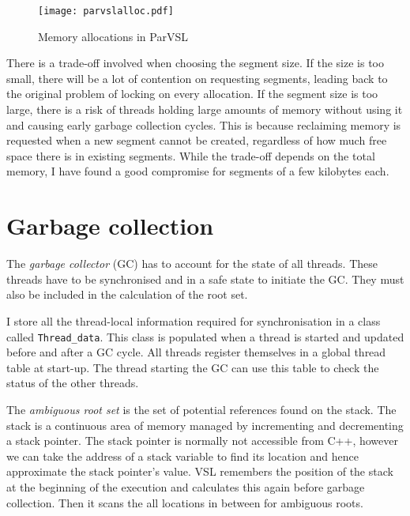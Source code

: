 \begin{figure}[H]
  \centering
  \texttt{[image: parvslalloc.pdf]}
  \label{fig:vslalloc}
  \caption{Memory allocations in ParVSL}
\end{figure}

There is a trade-off involved when choosing the segment size. If the size is too small,
there will be a lot of contention on requesting segments, leading back to the original
problem of locking on every allocation. If the segment size is too large, there is a risk
of threads holding large amounts of memory without using it and causing early garbage collection
cycles. This is because reclaiming memory is requested when a new segment cannot be created,
regardless of how much free space there is in existing segments. While the trade-off depends on the
total memory, I have found a good compromise for segments of a few kilobytes each.

\section{Garbage collection}
\label{sec:gc}
The \emph{garbage collector} (GC) has to account for the state of all threads. These threads have to be synchronised
and in a safe state to initiate the GC. They must also be included in the calculation of the root set.

I store all the thread-local information required for synchronisation in a class called \texttt{Thread\_data}. This
class is populated when a thread is started and updated before and after a GC cycle. All threads register
themselves in a global thread table at start-up. The thread starting the GC can use this table to check the status
of the other threads.

The \emph{ambiguous root set} is the set of potential references found on the stack. The stack is a continuous area
of memory managed by incrementing and decrementing a stack pointer. The stack pointer is normally not accessible
from C++, however we can take the address of a stack variable to find its location and hence approximate the
stack pointer's value. VSL remembers the position
of the stack at the beginning of the execution and calculates this again before garbage collection. Then it
scans the all locations in between for ambiguous roots.

